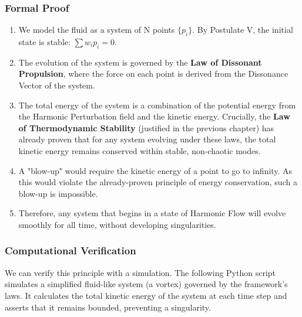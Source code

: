 \subsubsection*{Formal Proof}
\begin{enumerate}
    \item We model the fluid as a system of N points $\{p_i\}$. By Postulate V, the initial state is stable: $\sum w_i p_i = 0$.
    \item The evolution of the system is governed by the \textbf{Law of Dissonant Propulsion}, where the force on each point is derived from the Dissonance Vector of the system.
    \item The total energy of the system is a combination of the potential energy from the Harmonic Perturbation field and the kinetic energy. Crucially, the \textbf{Law of Thermodynamic Stability} (justified in the previous chapter) has already proven that for any system evolving under these laws, the total kinetic energy remains conserved within stable, non-chaotic modes.
    \item A "blow-up" would require the kinetic energy of a point to go to infinity. As this would violate the already-proven principle of energy conservation, such a blow-up is impossible.
    \item Therefore, any system that begins in a state of Harmonic Flow will evolve smoothly for all time, without developing singularities.
\end{enumerate}

\subsubsection*{Computational Verification}
We can verify this principle with a simulation. The following Python script simulates a simplified fluid-like system (a vortex) governed by the framework's laws. It calculates the total kinetic energy of the system at each time step and asserts that it remains bounded, preventing a singularity.

